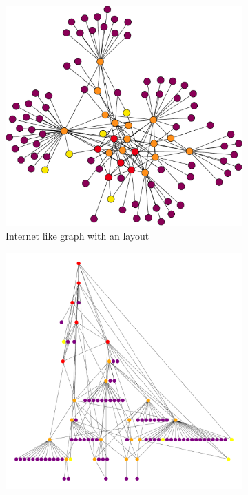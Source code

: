 \begin{figure}[h]
     \centering
     \begin{subfigure}[b]{0.45\textwidth}
         \centering
         \includegraphics[width=\textwidth]{images/internet_graph/graph-100-colored.pdf}
		 \caption{Internet like graph with an  layout}
         \label{fig:internet_graph_explosive}
     \end{subfigure}
     \hfill
     \begin{subfigure}[b]{0.45\textwidth}
         \centering
         \includegraphics[width=\textwidth]{images/internet_graph/graph_dot.pdf}

\end{subfigure}
\end{figure}
